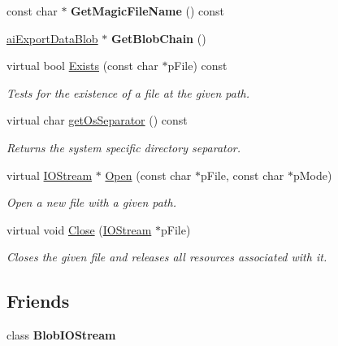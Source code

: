 \begin{DoxyCompactItemize}
\item 
\hypertarget{class_assimp_1_1_blob_i_o_system_a3f095261dc160a6c6f9df717c4fb5542}{const char $\ast$ {\bfseries Get\+Magic\+File\+Name} () const }\label{class_assimp_1_1_blob_i_o_system_a3f095261dc160a6c6f9df717c4fb5542}

\item 
\hypertarget{class_assimp_1_1_blob_i_o_system_abb21f29c5496a09471ccf2573c42f650}{\hyperlink{structai_export_data_blob}{ai\+Export\+Data\+Blob} $\ast$ {\bfseries Get\+Blob\+Chain} ()}\label{class_assimp_1_1_blob_i_o_system_abb21f29c5496a09471ccf2573c42f650}

\item 
virtual bool \hyperlink{class_assimp_1_1_blob_i_o_system_a747dd85d9949642404cbcdaf191c3732}{Exists} (const char $\ast$p\+File) const 
\begin{DoxyCompactList}\small\item\em Tests for the existence of a file at the given path. \end{DoxyCompactList}\item 
virtual char \hyperlink{class_assimp_1_1_blob_i_o_system_a6b418c72746d99e11d9a3dcc7080e70b}{get\+Os\+Separator} () const 
\begin{DoxyCompactList}\small\item\em Returns the system specific directory separator. \end{DoxyCompactList}\item 
virtual \hyperlink{class_assimp_1_1_i_o_stream}{I\+O\+Stream} $\ast$ \hyperlink{class_assimp_1_1_blob_i_o_system_a9245477f681ef86a4ac048b44ec109da}{Open} (const char $\ast$p\+File, const char $\ast$p\+Mode)
\begin{DoxyCompactList}\small\item\em Open a new file with a given path. \end{DoxyCompactList}\item 
virtual void \hyperlink{class_assimp_1_1_blob_i_o_system_a626f7f153b4f5ac39adf38b6a539bedb}{Close} (\hyperlink{class_assimp_1_1_i_o_stream}{I\+O\+Stream} $\ast$p\+File)
\begin{DoxyCompactList}\small\item\em Closes the given file and releases all resources associated with it. \end{DoxyCompactList}\end{DoxyCompactItemize}
\subsection*{Friends}
\begin{DoxyCompactItemize}
\item 
\hypertarget{class_assimp_1_1_blob_i_o_system_a57ecee319276a5cf2dd6a06f126c1b5c}{class {\bfseries Blob\+I\+O\+Stream}}\label{class_assimp_1_1_blob_i_o_system_a57ecee319276a5cf2dd6a06f126c1b5c}

\end{DoxyCompactItemize}


